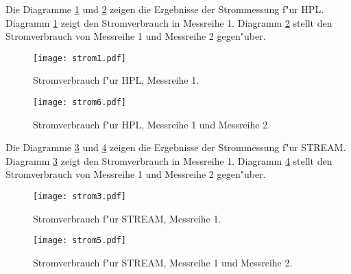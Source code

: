 Die Diagramme \ref{fig:strom1} und \ref{fig:strom6} zeigen die Ergebnisse der Strommessung f"ur HPL. Diagramm \ref{fig:strom1} zeigt den Stromverbrauch in Messreihe 1. Diagramm \ref{fig:strom6} stellt den Stromverbrauch von Messreihe 1 und Messreihe 2 gegen"uber. 
\begin{figure}[htb]
  \centering
  \texttt{[image: strom1.pdf]}\\ 
  \caption{Stromverbrauch f"ur HPL, Messreihe 1.}\label{fig:strom1}
\end{figure}
\begin{figure}[htb]
  \centering
  \texttt{[image: strom6.pdf]}\\ 
  \caption{Stromverbrauch f"ur HPL, Messreihe 1 und Messreihe 2.}\label{fig:strom6}
\end{figure}

\noindent
Die Diagramme \ref{fig:strom3} und \ref{fig:strom5} zeigen die Ergebnisse der Strommessung f"ur STREAM. Diagramm \ref{fig:strom3} zeigt den Stromverbrauch in Messreihe 1. Diagramm \ref{fig:strom5} stellt den Stromverbrauch von Messreihe 1 und Messreihe 2 gegen"uber.
\begin{figure}[htb]
  \centering
  \texttt{[image: strom3.pdf]}\\ 
  \caption{Stromverbrauch f"ur STREAM, Messreihe 1.}\label{fig:strom3}
\end{figure}
\begin{figure}[htb]
  \centering
  \texttt{[image: strom5.pdf]}\\ 
  \caption{Stromverbrauch f"ur STREAM, Messreihe 1 und Messreihe 2.}\label{fig:strom5}
\end{figure}
\endinput 


